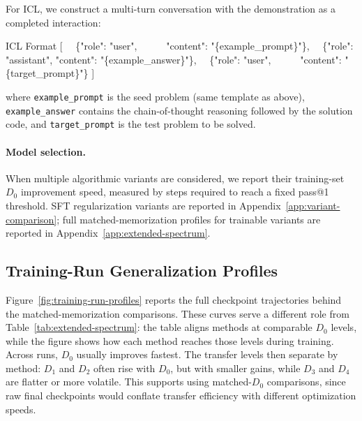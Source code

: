 \documentclass[]{bytedance_seed}
\theoremstyle{plain}
\theoremstyle{definition}
\theoremstyle{remark}
\begin{document}
\noindent For ICL, we construct a multi-turn conversation with the demonstration as a completed interaction:

\begin{problembox}{ICL Format}
\ttfamily\small
[\newline
~~\{"role": "user",~~~~~~"content": "\{example\_prompt\}"\},\newline
~~\{"role": "assistant", "content": "\{example\_answer\}"\},\newline
~~\{"role": "user",~~~~~~"content": "\{target\_prompt\}"\}\newline
]
\end{problembox}

\noindent where \texttt{example\_prompt} is the seed problem (same template as above), \texttt{example\_answer} contains the chain-of-thought reasoning followed by the solution code, and \texttt{target\_prompt} is the test problem to be solved.

\paragraph{Model selection.}
When multiple algorithmic variants are considered, we report their training-set $D_0$ improvement speed, measured by steps required to reach a fixed pass@1 threshold. SFT regularization variants are reported in Appendix~\ref{app:variant-comparison}; full matched-memorization profiles for trainable variants are reported in Appendix~\ref{app:extended-spectrum}.

\subsection{Training-Run Generalization Profiles}
\label{app:training-run-profiles}

Figure~\ref{fig:training-run-profiles} reports the full checkpoint trajectories behind the matched-memorization comparisons. These curves serve a different role from Table~\ref{tab:extended-spectrum}: the table aligns methods at comparable $D_0$ levels, while the figure shows how each method reaches those levels during training. Across runs, $D_0$ usually improves fastest. The transfer levels then separate by method: $D_1$ and $D_2$ often rise with $D_0$, but with smaller gains, while $D_3$ and $D_4$ are flatter or more volatile. This supports using matched-$D_0$ comparisons, since raw final checkpoints would conflate transfer efficiency with different optimization speeds.
\end{document}
